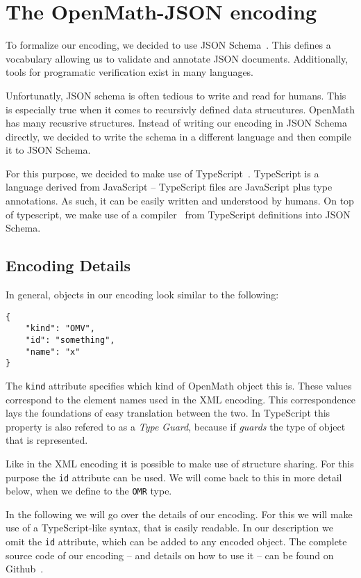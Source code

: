 \section{The OpenMath-JSON encoding}

To formalize our encoding, we decided to use JSON Schema~\cite{handrewsjsonschema:18}. 
This defines a vocabulary allowing us to validate and annotate JSON documents. 
Additionally, tools for programatic verification exist in many languages. 

Unfortunatly, JSON schema is often tedious to write and read for humans. 
This is especially true when it comes to recursivly defined data strucutures.
OpenMath has many recusrive structures.
Instead of writing our encoding in JSON Schema directly, we decided to write the schema in a different language and then compile it to JSON Schema. 

For this purpose, we decided to make use of TypeScript~\cite{typescript:webpage}. 
TypeScript is a language derived from JavaScript -- TypeScript files are JavaScript plus type annotations. 
As such, it can be easily written and understood by humans. 
On top of typescript, we make use of a compiler~\cite{vega-ts-jscon-schema-generator:webpage} from TypeScript definitions into JSON Schema. 

\subsection{Encoding Details}

In general, objects in our encoding look similar to the following:
\begin{lstlisting}
{
    "kind": "OMV",
    "id": "something",
    "name": "x"
}
\end{lstlisting}

The \texttt{kind} attribute specifies which kind of OpenMath object this is. 
These values correspond to the element names used in the XML encoding. 
This correspondence lays the foundations of easy translation between the two. 
In TypeScript this property is also refered to as a \textit{Type Guard}, because if \textit{guards} the type of object that is represented. 

Like in the XML encoding it is possible to make use of structure sharing. 
For this purpose the \texttt{id} attribute can be used. 
We will come back to this in more detail below, when we define to the \texttt{OMR} type.

In the following we will go over the details of our encoding. 
For this we will make use of a TypeScript-like syntax, that is easily readable. 
In our description we omit the \texttt{id} attribute, which can be added to any encoded object. 
The complete source code of our encoding -- and details on how to use it -- can be found on Github~\cite{URL:openmathjson:github}. 

